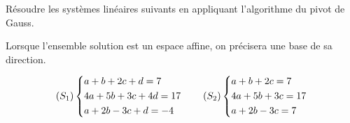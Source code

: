 \begin{corr}
\end{corr}

\begin{exo}
Résoudre les systèmes linéaires suivants en appliquant l'algorithme du pivot de Gauss.

Lorsque l'ensemble solution est un espace affine, on précisera une base de sa direction.

\[\left(S_1\right)\begin{dcases}
a+b+2c+d=7 \\
4a+5b+3c+4d=17 \\
a+2b-3c+d=-4
\end{dcases}\qquad\left(S_2\right)\begin{dcases}
a+b+2c=7 \\
4a+5b+3c=17 \\
a+2b-3c=7
\end{dcases}\]
\end{exo}

\begin{corr}
\end{corr}